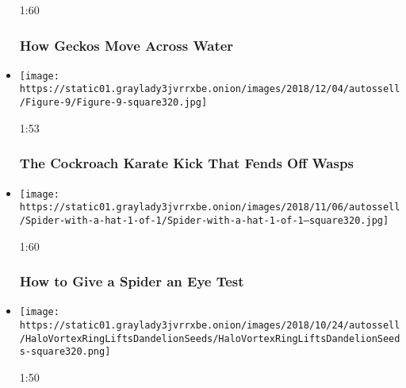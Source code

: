 \begin{itemize}
  1:60

  \hypertarget{how-geckos-move-across-water}{%
  \subsubsection{How Geckos Move Across
  Water}\label{how-geckos-move-across-water}}
\item
  \href{https://www.nytimes3xbfgragh.onion/video/science/100000006213475/the-cockroach-karate-kick-that-fends-off-wasps.html?action=click\&module=video-series-bar\&region=header\&pgtype=Article\&playlistId=video/sciencetake}{}

  \texttt{[image: https://static01.graylady3jvrrxbe.onion/images/2018/12/04/autossell/Figure-9/Figure-9-square320.jpg]}

  1:53

  \hypertarget{the-cockroach-karate-kick-that-fends-off-wasps}{%
  \subsubsection{The Cockroach Karate Kick That Fends Off
  Wasps}\label{the-cockroach-karate-kick-that-fends-off-wasps}}
\item
  \href{https://www.nytimes3xbfgragh.onion/video/science/100000006182460/how-to-give-a-spider-an-eye-test.html?action=click\&module=video-series-bar\&region=header\&pgtype=Article\&playlistId=video/sciencetake}{}

  \texttt{[image: https://static01.graylady3jvrrxbe.onion/images/2018/11/06/autossell/Spider-with-a-hat-1-of-1/Spider-with-a-hat-1-of-1--square320.jpg]}

  1:60

  \hypertarget{how-to-give-a-spider-an-eye-test}{%
  \subsubsection{How to Give a Spider an Eye
  Test}\label{how-to-give-a-spider-an-eye-test}}
\item
  \href{https://www.nytimes3xbfgragh.onion/video/science/100000006166266/how-a-vortex-helps-dandelions-fly.html?action=click\&module=video-series-bar\&region=header\&pgtype=Article\&playlistId=video/sciencetake}{}

  \texttt{[image: https://static01.graylady3jvrrxbe.onion/images/2018/10/24/autossell/HaloVortexRingLiftsDandelionSeeds/HaloVortexRingLiftsDandelionSeeds-square320.png]}

  1:50


\end{itemize}

